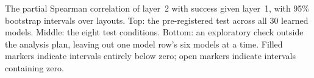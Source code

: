 \caption{The partial Spearman correlation of layer~2 with success given layer~1, with 95\% bootstrap intervals over layouts. Top: the pre-registered test across all 30 learned models. Middle: the eight test conditions. Bottom: an exploratory check outside the analysis plan, leaving out one model row's six models at a time. Filled markers indicate intervals entirely below zero; open markers indicate intervals containing zero.}